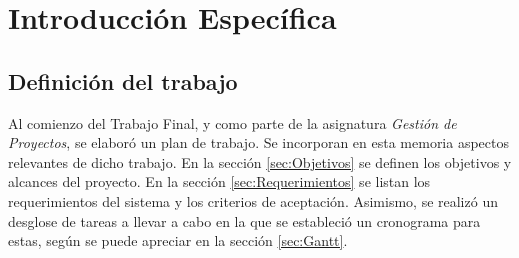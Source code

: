 \chapter{Introducción Específica} %

\label{Chapter2}


\section{Definición del trabajo}

Al comienzo del Trabajo Final, y como parte de la asignatura \textit{Gestión de Proyectos}, se elaboró un plan de trabajo. Se incorporan en esta memoria aspectos relevantes de dicho trabajo.  En la sección \ref{sec:Objetivos} se definen los objetivos y alcances del proyecto.  En la sección \ref{sec:Requerimientos} se listan los requerimientos del sistema y los criterios de aceptación. Asimismo, se realizó un desglose de tareas a llevar a cabo en la que se estableció un cronograma para estas, según se puede apreciar en la sección \ref{sec:Gantt}. 

